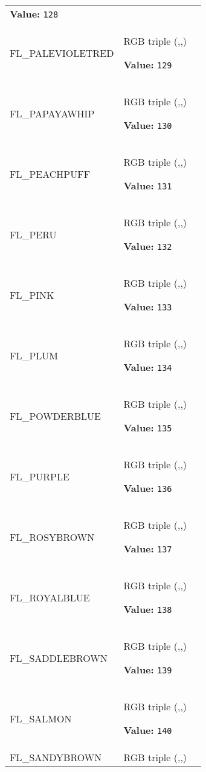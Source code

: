 \begin{longtable}{|p{\varnamewidth}|p{\vardescrwidth}|l}
\textbf{Value:} 
{\tt 128}&\\
\cline{1-2}
\raggedright F\-L\-\_\-P\-A\-L\-E\-V\-I\-O\-L\-E\-T\-R\-E\-D\- & \raggedright RGB triple (,,)

\textbf{Value:} 
{\tt 129}&\\
\cline{1-2}
\raggedright F\-L\-\_\-P\-A\-P\-A\-Y\-A\-W\-H\-I\-P\- & \raggedright RGB triple (,,)

\textbf{Value:} 
{\tt 130}&\\
\cline{1-2}
\raggedright F\-L\-\_\-P\-E\-A\-C\-H\-P\-U\-F\-F\- & \raggedright RGB triple (,,)

\textbf{Value:} 
{\tt 131}&\\
\cline{1-2}
\raggedright F\-L\-\_\-P\-E\-R\-U\- & \raggedright RGB triple (,,)

\textbf{Value:} 
{\tt 132}&\\
\cline{1-2}
\raggedright F\-L\-\_\-P\-I\-N\-K\- & \raggedright RGB triple (,,)

\textbf{Value:} 
{\tt 133}&\\
\cline{1-2}
\raggedright F\-L\-\_\-P\-L\-U\-M\- & \raggedright RGB triple (,,)

\textbf{Value:} 
{\tt 134}&\\
\cline{1-2}
\raggedright F\-L\-\_\-P\-O\-W\-D\-E\-R\-B\-L\-U\-E\- & \raggedright RGB triple (,,)

\textbf{Value:} 
{\tt 135}&\\
\cline{1-2}
\raggedright F\-L\-\_\-P\-U\-R\-P\-L\-E\- & \raggedright RGB triple (,,)

\textbf{Value:} 
{\tt 136}&\\
\cline{1-2}
\raggedright F\-L\-\_\-R\-O\-S\-Y\-B\-R\-O\-W\-N\- & \raggedright RGB triple (,,)

\textbf{Value:} 
{\tt 137}&\\
\cline{1-2}
\raggedright F\-L\-\_\-R\-O\-Y\-A\-L\-B\-L\-U\-E\- & \raggedright RGB triple (,,)

\textbf{Value:} 
{\tt 138}&\\
\cline{1-2}
\raggedright F\-L\-\_\-S\-A\-D\-D\-L\-E\-B\-R\-O\-W\-N\- & \raggedright RGB triple (,,)

\textbf{Value:} 
{\tt 139}&\\
\cline{1-2}
\raggedright F\-L\-\_\-S\-A\-L\-M\-O\-N\- & \raggedright RGB triple (,,)

\textbf{Value:} 
{\tt 140}&\\
\cline{1-2}
\raggedright F\-L\-\_\-S\-A\-N\-D\-Y\-B\-R\-O\-W\-N\- & \raggedright RGB triple (,,)


\end{longtable}
